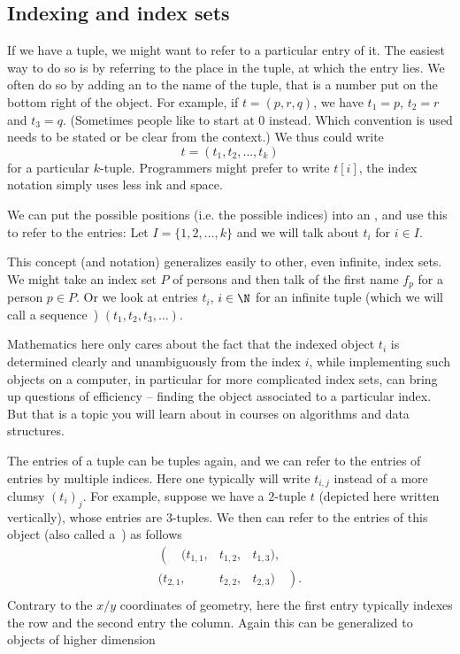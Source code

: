 \subsection{Indexing and index sets}

If we have a tuple, we might want to refer to a
particular entry of it. The easiest way to do so is by referring to the
place in the tuple, at which the entry lies. We often do so by adding an
 to the name of the tuple, 
that is a number put on the bottom right of the object. For
example, if $t=(p,r,q)$, we have $t_1=p$, $t_2=r$ and $t_3=q$. (Sometimes
people like to start at $0$ instead. Which convention is used needs to be
stated or be clear from the context.) We thus could write 
\[
t=(t_1,t_2,\ldots,t_k)
\]
for a particular $k$-tuple. Programmers might prefer to write $t[i]$, the
index notation simply uses less ink and space.
\smallskip

We can put the possible positions (i.e. the possible indices) into an 
, and use this to refer to the entries: Let
$I=\{1,2,\ldots,k\}$ and we will talk about $t_i$
for $i\in I$.  
\smallskip

This concept (and notation) generalizes easily to other, even infinite, index
sets. We might take an index set $P$ of persons and then talk of the first
name $f_p$ for a person $p\in P$. Or we look at entries $t_i$, $i\in\N$ for
an infinite tuple (which we will call a sequence~)
$(t_1,t_2,t_3,\ldots)$.

Mathematics here only cares about the fact that the indexed object $t_i$ is
determined clearly and unambiguously from the index $i$, while implementing
such objects on a computer, in particular for more complicated index sets,
can bring up questions of efficiency -- finding the object associated to a
particular index.  But that is a topic you will learn about in courses on
algorithms and data structures.
\medskip

The entries of a tuple can be tuples again, and we can refer to the entries
of entries by multiple indices. Here one typically will write $t_{i,j}$
instead of a more clumsy $(t_i)_j$.
For example, suppose we have a $2$-tuple $t$
(depicted here written vertically), whose entries are $3$-tuples. We then
can refer to the entries of this object (also called a~) as
follows
\[
\begin{array}{rcl}
\left(\quad(t_{1,1},\right.&t_{1,2},&t_{1,3}),\\
(t_{2,1},&t_{2,2},&t_{2,3})\left.\quad\right).\\
\end{array}
\]
Contrary to the $x/y$ coordinates of geometry, here the first entry
typically indexes the row and the second entry the column. Again this can
be generalized to objects of higher dimension

